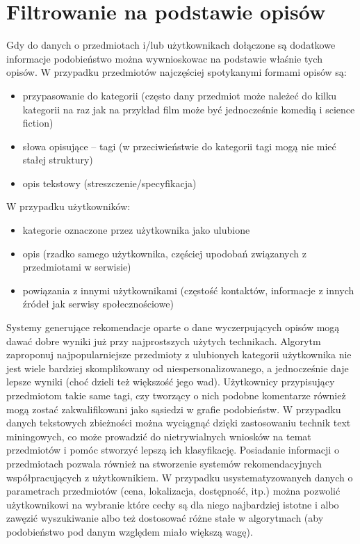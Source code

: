 \documentclass{pracamgr}
\begin{document}
  \section{Filtrowanie na podstawie opisów} %
   Gdy do danych o przedmiotach i/lub użytkownikach dołączone są dodatkowe informacje podobieństwo
   można wywnioskowac na podstawie właśnie tych opisów.\newline
   W przypadku przedmiotów najczęściej spotykanymi formami opisów są:
   \begin{itemize}\itemsep1pt \parskip0pt 
    \item przypasowanie do kategorii
     (często dany przedmiot może należeć do kilku kategorii na raz jak na przykład film może być jednocześnie komedią i science fiction)
    \item słowa opisujące -- tagi (w przeciwieństwie do kategorii tagi mogą nie mieć stałej struktury)
    \item opis tekstowy (streszczenie/specyfikacja)
   \end{itemize}
   W przypadku użytkowników:
   \begin{itemize}\itemsep1pt \parskip0pt 
    \item kategorie oznaczone przez użytkownika jako ulubione
    \item opis (rzadko samego użytkownika, częściej upodobań związanych z przedmiotami w serwisie)
    \item powiązania z innymi użytkownikami (częstość kontaktów, informacje z innych źródeł jak serwisy społecznościowe)
   \end{itemize}
   Systemy generujące rekomendacje oparte o dane wyczerpujących opisów mogą dawać dobre wyniki już przy najprostszych użytych technikach.
   Algorytm zaproponuj najpopularniejsze przedmioty z ulubionych kategorii użytkownika nie jest wiele bardziej skomplikowany od niespersonalizowanego,
   a jednocześnie daje lepsze wyniki (choć dzieli też większość jego wad).
   Użytkownicy przypisujący przedmiotom takie same tagi, czy tworzący o
   nich podobne komentarze również mogą zostać zakwalifikowani jako sąsiedzi w grafie podobieństw.
   W przypadku danych tekstowych zbieżności można wyciągnąć dzięki zastosowaniu technik text miningowych,
   co może prowadzić do nietrywialnych wniosków na temat przedmiotów i pomóc stworzyć lepszą ich klasyfikację.\newline
   Posiadanie informacji o przedmiotach pozwala również na stworzenie systemów rekomendacyjnych współpracujących z użytkownikiem.
   W przypadku usystematyzowanych danych o parametrach przedmiotów (cena, lokalizacja, dostępność, itp.)
   można pozwolić użytkownikowi na wybranie które cechy są dla niego najbardziej istotne i albo zawęzić wyszukiwanie albo też
   dostosować różne stałe w algorytmach (aby podobieństwo pod danym względem miało większą wagę).
\end{document}
